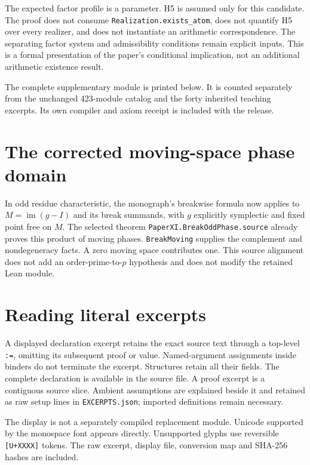 \documentclass[10pt,oneside]{book}
\begin{document}
The expected factor profile is a parameter. H5 is assumed only for this candidate. The proof does not consume \texttt{Realization.exists\_atom}, does not quantify H5 over every realizer, and does not instantiate an arithmetic correspondence. The separating factor system and admissibility conditions remain explicit inputs. This is a formal presentation of the paper's conditional implication, not an additional arithmetic existence result.

The complete supplementary module is printed below. It is counted separately from the unchanged 423-module catalog and the forty inherited teaching excerpts. Its own compiler and axiom receipt is included with the release.

\section{The corrected moving-space phase domain}
In odd residue characteristic, the monograph's breakwise formula now applies to \(M=\operatorname{im}(g-I)\) and its break summands, with \(g\) explicitly symplectic and fixed point free on \(M\). The selected theorem \nolinkurl{PaperXI.BreakOddPhase.source} already proves this product of moving phases. \nolinkurl{BreakMoving} supplies the complement and nondegeneracy facts. A zero moving space contributes one. This source alignment does not add an order-prime-to-\(p\) hypothesis and does not modify the retained Lean module.

\section{Reading literal excerpts}
A displayed declaration excerpt retains the exact source text through a top-level \texttt{:=}, omitting its subsequent proof or value. Named-argument assignments inside binders do not terminate the excerpt. Structures retain all their fields. The complete declaration is available in the source file. A proof excerpt is a contiguous source slice. Ambient assumptions are explained beside it and retained as raw setup lines in \texttt{EXCERPTS.json}; imported definitions remain necessary.

The display is not a separately compiled replacement module. Unicode supported by the monospace font appears directly. Unsupported glyphs use reversible \texttt{[U+XXXX]} tokens. The raw excerpt, display file, conversion map and SHA-256 hashes are included.
\end{document}
